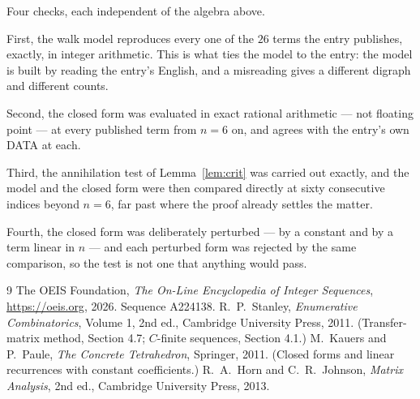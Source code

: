 \documentclass[11pt,a4paper]{article}
\theoremstyle{plain}
\theoremstyle{definition}
\begin{document}
Four checks, each independent of the algebra above.

First, the walk model reproduces every one of the $26$ terms the entry publishes,
exactly, in integer arithmetic. This is what ties the model to the entry: the model is built
by reading the entry's English, and a misreading gives a different digraph and different
counts.

Second, the closed form was evaluated in exact rational arithmetic --- not floating point ---
at every published term from $n=6$ on, and agrees with the entry's own DATA at each.

Third, the annihilation test of Lemma~\ref{lem:crit} was carried out exactly, and the model
and the closed form were then compared directly at sixty consecutive indices beyond
$n=6$, far past where the proof already settles the matter.

Fourth, the closed form was deliberately perturbed --- by a constant and by a term linear in
$n$ --- and each perturbed form was rejected by the same comparison, so the test is not one
that anything would pass.

\begin{thebibliography}{9}
 The OEIS Foundation, \emph{The On-Line Encyclopedia of Integer
Sequences}, \url{https://oeis.org}, 2026. Sequence A224138.
 R.~P.~Stanley, \emph{Enumerative Combinatorics}, Volume 1, 2nd ed.,
Cambridge University Press, 2011. (Transfer-matrix method, Section 4.7; $C$-finite sequences,
Section 4.1.)
 M.~Kauers and P.~Paule, \emph{The Concrete Tetrahedron}, Springer, 2011.
(Closed forms and linear recurrences with constant coefficients.)
 R.~A.~Horn and C.~R.~Johnson, \emph{Matrix Analysis}, 2nd ed., Cambridge
University Press, 2013.
\end{thebibliography}
\end{document}
